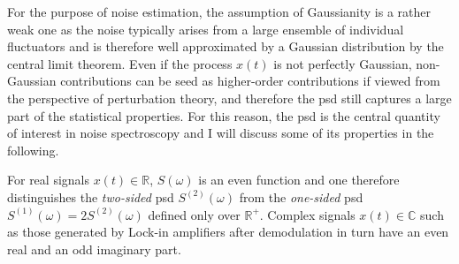 For the purpose of noise estimation, the assumption of Gaussianity is a rather weak one as the noise typically arises from a large ensemble of individual fluctuators and is therefore well approximated by a Gaussian distribution by the central limit theorem.
Even if the process $x(t)$ is not perfectly Gaussian, non-Gaussian contributions can be seed as higher-order contributions if viewed from the perspective of perturbation theory, and therefore the \gls{psd} still captures a large part of the statistical properties.
For this reason, the \gls{psd} is the central quantity of interest in noise spectroscopy and I will discuss some of its properties in the following.

For real signals $x(t) \in\mathbb{R}$, $S(\omega)$ is an even function and one therefore distinguishes the \emph{two-sided} \gls{psd} $S^{(2)}(\omega)$ from the \emph{one-sided} \gls{psd} $S^{(1)}(\omega) = 2 S^{(2)}(\omega)$ defined only over $\mathbb{R}^+$.
Complex signals $x(t)\in\mathbb{C}$ such as those generated by Lock-in amplifiers after demodulation in turn have an even real and an odd imaginary part.
